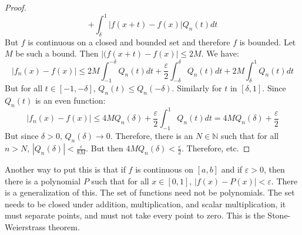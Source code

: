 \documentclass[crop=false,class=article,oneside]{standalone}
\begin{document}
\begin{proof}
\begin{equation*}
            +\int_{\delta}^{1}|f(x+t)-f(x)|Q_{n}(t)dt
        \end{equation*}
        But $f$ is continuous on a closed and bounded
        set and therefore $f$ is bounded. Let $M$ be
        such a bound. Then $|(f(x+t)-f(x)|\leq{2M}$.
        We have:
        \begin{equation*}
            |f_{n}(x)-f(x)|\leq
            2M\int_{-1}^{-\delta}Q_{n}(t)dt
            +\frac{\varepsilon}{2}
            \int_{-\delta}^{\delta}Q_{n}(t)dt
            +2M\int_{\delta}^{1}Q_{n}(t)dt
        \end{equation*}
        But for all $t\in[-1,-\delta]$,
        $Q_{n}(t)\leq{Q_{n}(-\delta)}$. Similarly for
        $t$ in $[\delta,1]$. Since $Q_{n}(t)$
        is an even function:
        \begin{equation*}
            |f_{n}(x)-f(x)|\leq
            4MQ_{n}(\delta)+
            \frac{\varepsilon}{2}\int_{-1}^{1}Q_{n}(t)dt
            =4MQ_{n}(\delta)+\frac{\varepsilon}{2}
        \end{equation*}
        But since $\delta>0$, $Q_{n}(\delta)\rightarrow0$.
        Therefore, there is an $N\in\mathbb{N}$ such that
        for all $n>N$,
        $|Q_{n}(\delta)|<\frac{\varepsilon}{8M}$.
        But then $4MQ_{n}(\delta)<\frac{\varepsilon}{2}$.
        Therefore, etc.
    \end{proof}
        Another way to put this is that if $f$ is continuous
        on $[a,b]$ and if $\varepsilon>0$, then there is
        a polynomial $P$ such that for all $x\in[0,1]$,
        $|f(x)-P(x)|<\varepsilon$. There is a generalization
        of this. The set of functions need not be
        polynomials. The set needs to be closed
        under addition, multiplication, and scalar
        multiplication, it must separate points,
        and must not take every point to zero.
        This is the Stone-Weierstrass theorem.
\end{document}
